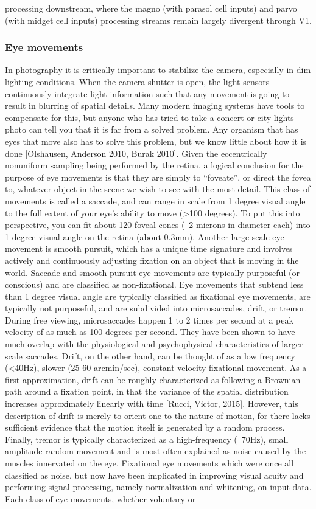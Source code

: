 processing downstream, where the magno (with parasol cell inputs) and parvo (with midget cell inputs) processing streams remain largely divergent through V1.

\subsubsection{Eye movements} In photography it is critically important to stabilize the camera, especially in dim lighting conditions. When the camera shutter is open, the light sensors continuously integrate light information such that any movement is going to result in blurring of spatial details. Many modern imaging systems have tools to compensate for this, but anyone who has tried to take a concert or city lights photo can tell you that it is far from a solved problem. Any organism that has eyes that move also has to solve this problem, but we know little about how it is done [Olshausen, Anderson 2010, Burak 2010]. Given the eccentrically nonuniform sampling being performed by the retina, a logical conclusion for the purpose of eye movements is that they are simply to “foveate”, or direct the fovea to, whatever object in the scene we wish to see with the most detail. This class of movements is called a saccade, and can range in scale from 1 degree visual angle to the full extent of your eye’s ability to move (>100 degrees). To put this into perspective, you can fit about 120 foveal cones (~2 microns in diameter each) into 1 degree visual angle on the retina (about 0.3mm). Another large scale eye movement is smooth pursuit, which has a unique time signature and involves actively and continuously adjusting fixation on an object that is moving in the world. Saccade and smooth pursuit eye movements are typically purposeful (or conscious) and are classified as non-fixational. Eye movements that subtend less than 1 degree visual angle are typically classified as fixational eye movements, are typically not purposeful, and are subdivided into microsaccades, drift, or tremor. During free viewing, microsaccades happen 1 to 2  times per second at a peak velocity of as much as 100 degrees per second. They have been shown to have much overlap with the physiological and psychophysical characteristics of larger-scale saccades. Drift, on the other hand, can be thought of as a low frequency (<40Hz), slower (25-60 arcmin/sec), constant-velocity fixational movement. As a first approximation, drift can be roughly characterized as following a Brownian path around a fixation point, in that the variance of the spatial distribution increases approximately linearly with time [Rucci, Victor, 2015]. However, this description of drift is merely to orient one to the nature of motion, for there lacks sufficient evidence that the motion itself is generated by a random process. Finally, tremor is typically characterized as a high-frequency (~70Hz), small amplitude random movement and is most often explained as noise caused by the muscles innervated on the eye. Fixational eye movements which were once all classified as noise, but now have been implicated in improving visual acuity and performing signal processing, namely normalization and whitening, on input data. Each class of eye movements, whether voluntary or 